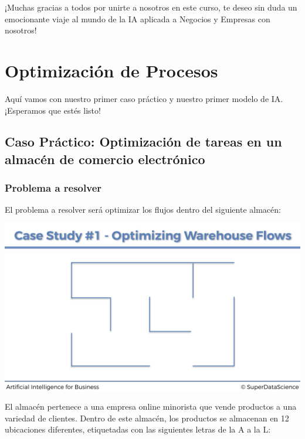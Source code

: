 \documentclass[]{book}
\begin{document}
¡Muchas gracias a todos por unirte a nosotros en este curso, te deseo sin duda un emocionante viaje al mundo de la IA aplicada a Negocios y Empresas con nosotros!

\hypertarget{optimizaciuxf3n-de-procesos}{%
\chapter{Optimización de Procesos}\label{optimizaciuxf3n-de-procesos}}

Aquí vamos con nuestro primer caso práctico y nuestro primer modelo de IA. ¡Esperamos que estés listo!

\hypertarget{caso-pruxe1ctico-optimizaciuxf3n-de-tareas-en-un-almacuxe9n-de-comercio-electruxf3nico}{%
\section{Caso Práctico: Optimización de tareas en un almacén de comercio electrónico}\label{caso-pruxe1ctico-optimizaciuxf3n-de-tareas-en-un-almacuxe9n-de-comercio-electruxf3nico}}

\hypertarget{problema-a-resolver}{%
\subsection{Problema a resolver}\label{problema-a-resolver}}

El problema a resolver será optimizar los flujos dentro del siguiente almacén:

\includegraphics[width=1\textwidth,height=\textheight]{Images/Warehouse_1.png}

El almacén pertenece a una empresa online minorista que vende productos a una variedad de clientes. Dentro de este almacén, los productos se almacenan en 12 ubicaciones diferentes, etiquetadas con las siguientes letras de la A a la L:
\end{document}
